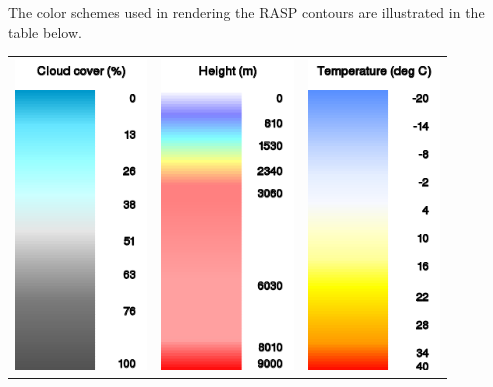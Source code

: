 \documentclass[a4paper,12pt]{refrep}
\begin{document}
\begin{maxipage}
The color schemes used in rendering the RASP contours are illustrated
in the table below.

\begin{longtable}{c c c}
\includegraphics[angle=0,width=3.5cm,keepaspectratio='true']{figures/ramp-rasp-cloudpct.png}&

\includegraphics[angle=0,width=3.5cm,keepaspectratio='true']{figures/ramp-rasp-h.png}&

\includegraphics[angle=0,width=3.5cm,keepaspectratio='true']{figures/ramp-rasp-temperature.png}\\


\end{longtable}
\end{maxipage}
\end{document}
